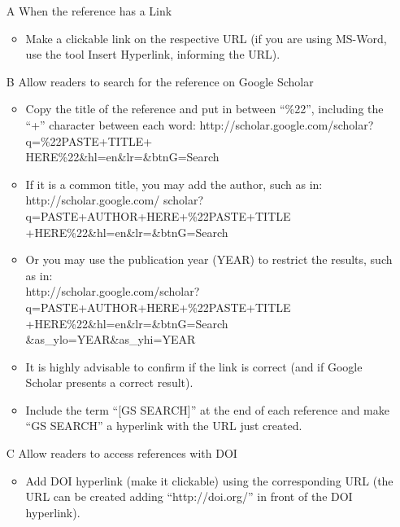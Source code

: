 \documentclass[english, spanish, brazilian]{RBIEarticle} %
\begin{document}
    \begin{enumerate}
        \item[A] When the reference has a Link
        \begin{itemize}
            \item Make a clickable link on the respective URL (if you are using MS-Word, use the tool Insert Hyperlink, informing the URL).
        \end{itemize}
        \item[B] Allow readers to search for the reference on Google Scholar
        \begin{itemize}
            \item Copy the title of the reference and put in between ``\%22'', including the ``+'' character between each word: http://scholar.google.com/scholar?q=\%22PASTE+TITLE+\\HERE\%22\&hl=en\&lr=\&btnG=Search
            \item If it is a common title, you may add the author, such as in: \\http://scholar.google.com/ scholar?q=PASTE+AUTHOR+HERE+\%22PASTE+TITLE\\+HERE\%22\&hl=en\&lr=\&btnG=Search
            \item Or you may use the publication year (YEAR) to restrict the results, such as in:\\ http://scholar.google.com/scholar?
            q=PASTE+AUTHOR+HERE+\%22PASTE+TITLE\\+HERE\%22\&hl=en\&lr=\&btnG=Search \&as\_ylo=YEAR\&as\_yhi=YEAR
            \item It is highly advisable to confirm if the link is correct (and if Google Scholar presents a correct result).
            \item Include the term ``[GS SEARCH]'' at the end of each reference and make “GS SEARCH” a hyperlink with the URL just created.
        \end{itemize}
        \item[C] Allow readers to access references with DOI
        \begin{itemize}
            \item Add DOI hyperlink (make it clickable) using the corresponding URL (the URL can be created adding ``http://doi.org/'' in front of the DOI hyperlink).
        \end{itemize}
    \end{enumerate}
\fi
\end{document}
